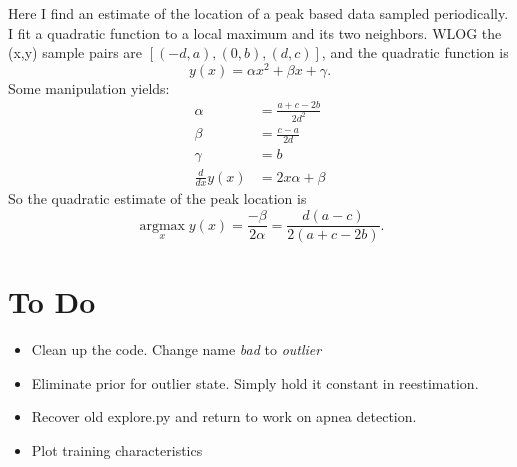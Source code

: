 \documentclass[12pt]{article}
\newcommand{\argmax}{\operatorname*{argmax}}
\begin{document}
Here I find an estimate of the location of a peak based data sampled
periodically.  I fit a quadratic function to a local maximum and its
two neighbors.  WLOG the (x,y) sample pairs are $[(-d,a), (0,b),
(d,c)]$, and the quadratic function is
\begin{equation*}
  y(x) = \alpha x^2 + \beta x + \gamma.
\end{equation*}
Some manipulation yields:
\begin{align*}
  \alpha &= \frac{a+c-2b}{2d^2} \\
  \beta &= \frac{c-a}{2d} \\
  \gamma &= b \\
  \frac{d}{dx} y(x) &= 2x\alpha + \beta
\end{align*}
So the quadratic estimate of the peak location is
\begin{equation*}
  \argmax_x y(x) = \frac{-\beta}{2\alpha} = \frac{d(a-c)}{2(a+c-2b)}.
\end{equation*}

\section{To Do}
\label{sec:todo}

\begin{itemize}
\item Clean up the code.  Change name \emph{bad} to \emph{outlier}
\item Eliminate prior for outlier state.  Simply hold it constant in
  reestimation.
\item Recover old explore.py and return to work on apnea detection.
\end{itemize}

\begin{itemize}
\item Plot training characteristics
\end{itemize}
\end{document}
